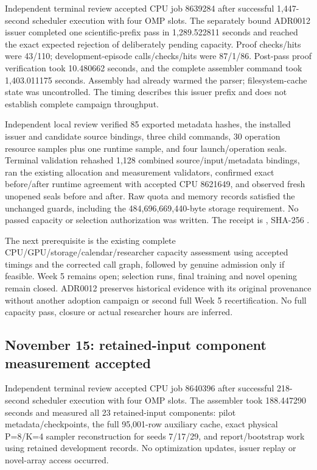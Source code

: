Independent terminal review accepted CPU job 8639284 after successful
1,447-second scheduler execution with four OMP slots. The separately bound
ADR0012 issuer completed one scientific-prefix pass in 1,289.522811 seconds
and reached the exact expected rejection of deliberately pending capacity.
Proof checks/hits were 43/110; development-episode calls/checks/hits were
87/1/86. Post-pass proof verification took 10.480662 seconds, and the complete
assembler command took 1,403.011175 seconds. Assembly had already warmed the
parser; filesystem-cache state was uncontrolled. The timing describes this
issuer prefix and does not establish complete campaign throughput.

Independent local review verified 85 exported metadata hashes, the installed
issuer and candidate source bindings, three child commands, 30 operation
resource samples plus one runtime sample, and four launch/operation seals.
Terminal validation rehashed 1,128 combined source/input/metadata bindings,
ran the existing allocation and measurement validators, confirmed exact
before/after runtime agreement with accepted CPU 8621649, and observed fresh
unopened seals before and after. Raw quota and memory records satisfied the
unchanged guards, including the 484,696,669,440-byte storage requirement.
No passed capacity or selection authorization was written. The receipt is
,
SHA-256
.

The next prerequisite is the existing complete CPU/GPU/storage/calendar/researcher
capacity assessment using accepted timings and the corrected call graph, followed
by genuine admission only if feasible. Week 5 remains open; selection runs,
final training and novel opening remain closed. ADR0012 preserves historical
evidence with its original provenance without another adoption campaign or
second full Week 5 recertification. No full capacity pass, closure or actual
researcher hours are inferred.

\subsection*{November 15: retained-input component measurement accepted}

Independent terminal review accepted CPU job 8640396 after successful
218-second scheduler execution with four OMP slots. The assembler took
188.447290 seconds and measured all 23 retained-input components: pilot
metadata/checkpoints, the full 95,001-row auxiliary cache, exact physical
P=8/K=4 sampler reconstruction for seeds 7/17/29, and report/bootstrap work
using retained development records. No optimization updates, issuer replay
or novel-array access occurred.

